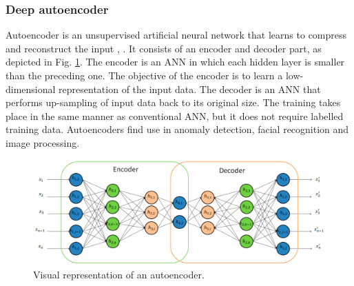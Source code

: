 \documentclass[conference, 11pt]{IEEEtran}
\begin{document}
    \subsubsection{Deep autoencoder}
    Autoencoder is an unsupervised artificial neural network that learns to compress and reconstruct the input \cite{ballard1987modular}, \cite{rumelhart1985learning}.
    It consists of an encoder and decoder part, as depicted in Fig. \ref{fig:ae}.
    The encoder is an ANN in which each hidden layer is smaller than the preceding one.
    The objective of the encoder is to learn a low-dimensional representation of the input data.
    The decoder is an ANN that performs up-sampling of input data back to its original size.
    The training takes place in the same manner as conventional ANN, but it does not require labelled training data.
    Autoencoders find use in anomaly detection, facial recognition and image processing.

    \begin{figure}[htbp]
        \centerline{\includegraphics[width=\linewidth]{figures/ae.jpg}}
        \caption{Visual representation of an autoencoder. \cite{article:18}}
        \label{fig:ae}
    \end{figure}
\end{document}
